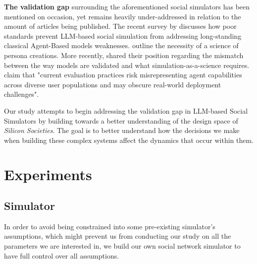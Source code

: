 \documentclass{article} %
\begin{document}
\textbf{The validation gap} surrounding the aforementioned social simulators has been mentioned on occasion, yet remains heavily under-addressed in relation to the amount of articles being published. The recent survey by \cite{larooij2025largelanguagemodelssolve} discusses how poor standards prevent LLM-based social simulation from addressing long-standing classical Agent-Based models weaknesses. \cite{li2025llmgeneratedpersonapromise} outline the necessity of a science of persona creations. More recently, \cite{li2026positionaiagentsyet} shared their position regarding the mismatch between the way models are validated and what simulation-as-a-science requires. \cite{seshadri2026lost} claim that "current evaluation practices risk misrepresenting agent capabilities across diverse user populations and may obscure real-world deployment challenges".

Our study attempts to begin addressing the validation gap in LLM-based Social Simulators by building towards a better understanding of the design space of \textit{Silicon Societies}.
The goal is to better  understand how the decisions we make when building these complex systems affect the dynamics that occur within them. %


\section{Experiments}

\subsection{Simulator}

In order to avoid being constrained into some pre-existing simulator's assumptions, which might prevent us from conducting our study on all the parameters we are interested in, we build our own social network simulator to have full control over all assumptions.
\end{document}
